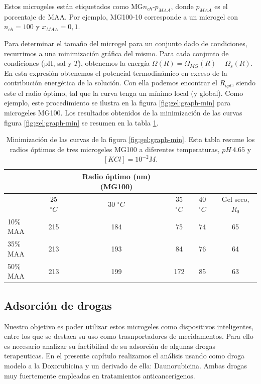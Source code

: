 Estos microgeles est\'an etiquetados como MG$n_{ch}$-$p_{MAA}$, donde $p_{MAA}$ es el porcentaje de MAA.
Por ejemplo, MG100-10 corresponde a un  microgel con $n_{ch}=100$ y $x_{MAA}=0,1$.


Para determinar el tama\~no del microgel para un conjunto dado de condiciones, recurrimos a una minimizaci\'on gr\'afica del mismo.
Para cada conjunto de condiciones (pH, sal y $T$), obtenemos la energ\'ia $\Omega(R)=\Omega_{MG}(R)-\Omega_{s}(R)$. En esta expresi\'on obtenemos el potencial termodin\'amico en exceso de la contribuci\'on energ\'etica de la soluci\'on.
Con ella podemos encontrar el $R_{opt }$, siendo este el radio \'optimo, tal que la curva tenga un m\'inimo local (y global).
Como ejemplo, este procedimiento se ilustra en la figura \ref{fig:gel:graph-min} para microgeles MG100.
Los resultados obtenidos de la minimizaci\'on de las curvas figura \ref{fig:gel:graph-min} se resumen en la tabla \ref{table:gel:optimal-R}.

\begin{table}[!htb]
\centering
\small
  \begin{tabular}{|lccccc|}
   \hline %
    	&&   Radio \'optimo (nm)(MG100) & && \\
    	\hline
      & {25 $^\circ C$} & {30 $^\circ C$} & {35 $^\circ C$} & {40 $^\circ C$} & {Gel seco, $R_0$} \\
      \hline
    10\% MAA & 215 &  184 &  75  &  74 & 65\\
    35\% MAA &  213 &  193 &  84 & 76 & 64\\
    50\% MAA &  213 & 199 &  172 & 85 & 63\\
    \hline
  \end{tabular}
 \caption{Minimizaci\'on de las curvas de la  figura \ref{fig:gel:graph-min}.
 	Esta tabla resume los radios \'optimos de tres microgeles MG100 a diferentes temperaturas, $pH\,4.65$ y $[KCl]=10^{-2}M$.}
\label{table:gel:optimal-R} 
\end{table}


\subsection{Adsorci\'on de drogas}\label{sec:gel:adsorcion}

Nuestro objetivo es poder utilizar estos microgeles como dispositivos inteligentes, entre los que se destaca su uso como trasnportadores de mecidamentos. Para ello es necesario analizar su factibiliad de su adsorci\'on de algunas drogas terapeuticas. En el presente cap\'itulo realizamos el an\'alisis usando como droga modelo a la Doxorubicina y un derivado de ella: Daunorubicina. Ambas drogas muy fuertemente empleadas en tratamientos anticancerigenos. 

